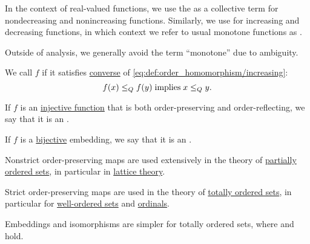 \begin{definition}
\begin{thmenum}
     In the context of real-valued functions, we use the   as a collective term for nondecreasing and nonincreasing functions. Similarly, we use  for increasing and decreasing functions, in which context we refer to usual monotone functions as .

    Outside of analysis, we generally avoid the term \enquote{monotone} due to ambiguity.

     We call \( f \)  if it satisfies \hyperref[def:material_implication/converse]{converse} of \eqref{eq:def:order_homomorphism/increasing}:
    \begin{equation}\label{eq:def:order_homomorphism/reflecting}
      f(x) \leq_Q f(y) \T{implies} x \leq_Q y.
    \end{equation}

     If \( f \) is an \hyperref[def:function_invertibility/injective]{injective function} that is both order-preserving and order-reflecting, we say that it is an .

     If \( f \) is a \hyperref[def:function_invertibility/bijective]{bijective} embedding, we say that it is an .
  \end{thmenum}
\end{definition}
\begin{comments}
  \item Nonstrict order-preserving maps are used extensively in the theory of \hyperref[subsec:partially_ordered_sets]{partially ordered sets}, in particular in \hyperref[subsec:lattices]{lattice theory}.

  \item Strict order-preserving maps are used in the theory of \hyperref[subsec:partially_ordered_sets]{totally ordered sets}, in particular for \hyperref[subsec:well_ordered_sets]{well-ordered sets} and \hyperref[subsec:ordinals]{ordinals}.

  \item Embeddings and isomorphisms are simpler for totally ordered sets, where  and  hold.
\end{comments}

